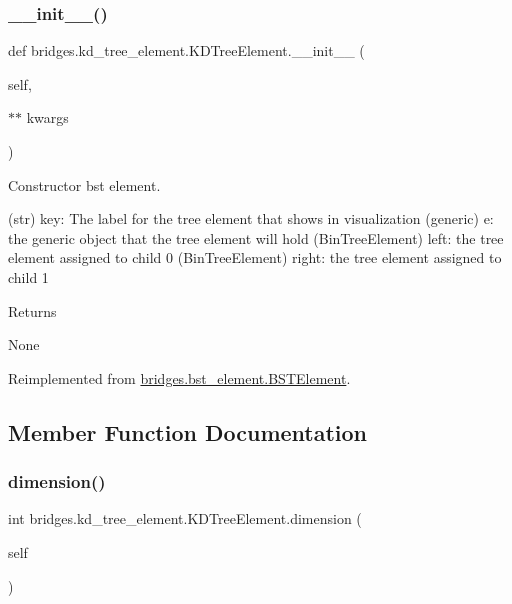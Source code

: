 \subsubsection{\texorpdfstring{\_\_init\_\_()}{\_\_init\_\_()}}
{\footnotesize\ttfamily def bridges.\+kd\+\_\+tree\+\_\+element.\+K\+D\+Tree\+Element.\+\_\+\+\_\+init\+\_\+\+\_\+ (\begin{DoxyParamCaption}\item[{}]{self,  }\item[{$\ast$$\ast$}]{kwargs }\end{DoxyParamCaption})}



Constructor bst element. 

\begin{DoxyVerb}       (str) key: The label for the tree element that shows in visualization
       (generic) e: the generic object that the tree element will hold
       (BinTreeElement) left: the tree element assigned to child 0
       (BinTreeElement) right: the tree element assigned to child 1
\end{DoxyVerb}
 \begin{DoxyReturn}{Returns}


None 
\end{DoxyReturn}


Reimplemented from \mbox{\hyperlink{classbridges_1_1bst__element_1_1_b_s_t_element_a0be9b75a1da9322d40811669d13e05a4}{bridges.\+bst\+\_\+element.\+B\+S\+T\+Element}}.



\subsection{Member Function Documentation}
\mbox{\label{classbridges_1_1kd__tree__element_1_1_k_d_tree_element_a2f600f754650ce8ea08954b969a5dae8}} 
\subsubsection{\texorpdfstring{dimension()}{dimension()}\hspace{0.1cm}{\footnotesize\ttfamily [1/2]}}
{\footnotesize\ttfamily  int bridges.\+kd\+\_\+tree\+\_\+element.\+K\+D\+Tree\+Element.\+dimension (\begin{DoxyParamCaption}\item[{}]{self }\end{DoxyParamCaption})}



